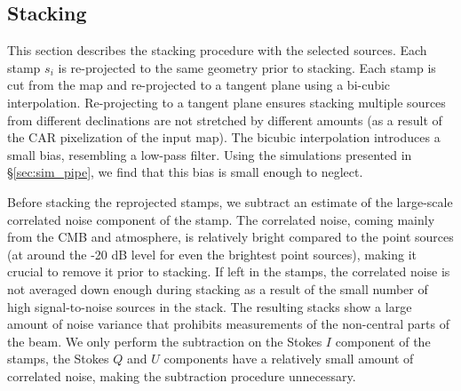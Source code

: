\subsection{Stacking}
\label{subsec:stacking}
This section describes the stacking procedure with the selected sources.  Each stamp $s_i$ is re-projected to the same geometry prior to stacking.  Each stamp is cut from the map and re-projected to a tangent plane using a bi-cubic interpolation.  Re-projecting to a tangent plane ensures stacking multiple sources from different declinations are not stretched by different amounts (as a result of the CAR pixelization of the input map).  The bicubic interpolation introduces a small bias, resembling a low-pass filter. Using the simulations presented in \S\ref{sec:sim_pipe}, we find that this bias is small enough to neglect.

Before stacking the reprojected stamps, we subtract an estimate of the large-scale correlated noise component of the stamp. The correlated noise, coming mainly from the CMB and atmosphere, is relatively bright compared to the point sources (at around the -20 dB level for even the brightest point sources), making it crucial to remove it prior to stacking.  If left in the stamps, the correlated noise is not averaged down enough during stacking as a result of the small number of high signal-to-noise sources in the stack. The resulting stacks show a large amount of noise variance that prohibits measurements of the non-central parts of the beam. We only perform the subtraction on the Stokes $I$ component of the stamps, the Stokes $Q$ and $U$ components have a relatively small amount of correlated noise, making the subtraction procedure unnecessary.

